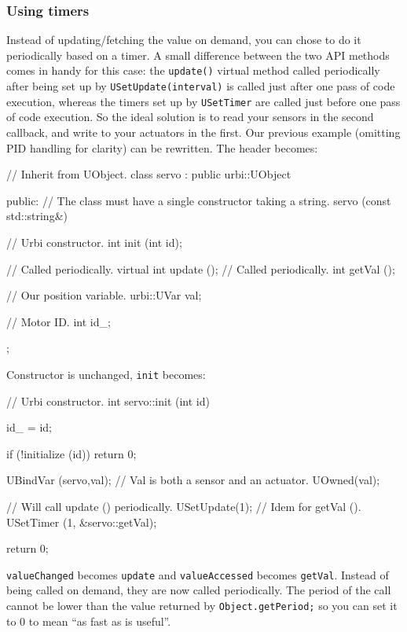 \subsubsection{Using timers}

Instead of updating/fetching the value on demand, you can chose to do
it periodically based on a timer. A small difference between the two
API methods comes in handy for this case: the \lstinline{update()}
virtual method called periodically after being set up by
\lstinline{USetUpdate(interval)} is called just after one pass of
\urbi code execution, whereas the timers set up by
\lstinline{USetTimer} are called just before one pass of \urbi code
execution. So the ideal solution is to read your sensors in the second
callback, and write to your actuators in the first. Our previous
example (omitting PID handling for clarity) can be rewritten. The
header becomes:

\begin{cxx}
// Inherit from UObject.
class servo : public urbi::UObject
{
public:
  // The class must have a single constructor taking a string.
  servo (const std::string&)

  // Urbi constructor.
  int init (int id);

  // Called periodically.
  virtual int update ();
  // Called periodically.
  int getVal ();

  // Our position variable.
  urbi::UVar val;

  // Motor ID.
  int id_;
};
\end{cxx}

Constructor is unchanged, \lstinline{init} becomes:

\begin{cxx}
// Urbi constructor.
int
servo::init (int id)
{
  id_ = id;

  if (!initialize (id))
    return 0;

  UBindVar (servo,val);
  // Val is both a sensor and an actuator.
  UOwned(val);

  // Will call update () periodically.
  USetUpdate(1);
  // Idem for getVal ().
  USetTimer (1, &servo::getVal);

  return 0;
}
\end{cxx}

\lstinline{valueChanged} becomes \lstinline{update} and
\lstinline{valueAccessed} becomes \lstinline{getVal}. Instead of being
called on demand, they are now called periodically. The period of the
call cannot be lower than the value returned by
\lstinline{Object.getPeriod;}
so you can set it to 0 to mean ``as fast as is useful''.

